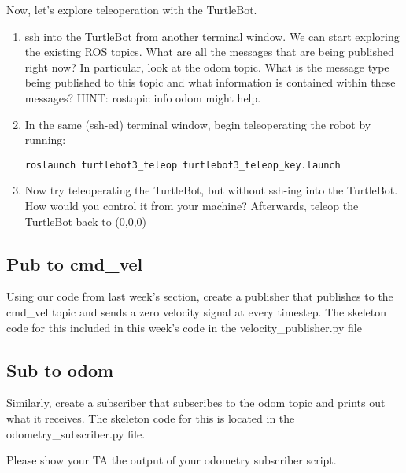 \documentclass{article}
\begin{document}
Now, let's explore teleoperation with the TurtleBot.

\begin{enumerate}
\item ssh into the TurtleBot from another terminal window. We can start exploring the existing ROS topics. What are all the messages that are being published right now? In particular, look at the odom topic. What is the message type being published to this topic and what information is contained within these messages? HINT: rostopic info odom might help.	
\item In the same (ssh-ed) terminal window, begin teleoperating the robot by running:
\begin{lstlisting}
roslaunch turtlebot3_teleop turtlebot3_teleop_key.launch
\end{lstlisting}
\item Now try teleoperating the TurtleBot, but without ssh-ing into the TurtleBot. How would you control it from your machine? Afterwards, teleop the TurtleBot back to (0,0,0)
\end{enumerate}

\subsection{Pub to cmd\_vel}
Using our code from last week's section, create a publisher that publishes to the cmd\_vel topic and sends a zero velocity signal at every timestep. The skeleton code for this included in this week's code in the velocity\_publisher.py file
\subsection{Sub to odom}
Similarly, create a subscriber that subscribes to the odom topic and prints out what it receives. The skeleton code for this is located in the odometry\_subscriber.py file.


Please show your TA the output of your odometry subscriber script.
\end{document}
